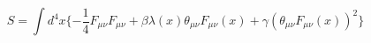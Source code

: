 \begin{equation} S= \int d^4x \{-
 \frac{1}{4}F_{\mu \nu}F_{\mu \nu}+ \beta \lambda(x) \theta_{\mu
 \nu}F_{\mu \nu}(x)+ \gamma(\theta_{\mu \nu}F_{\mu \nu}(x))^2 \} \label{9}
 \end{equation}

